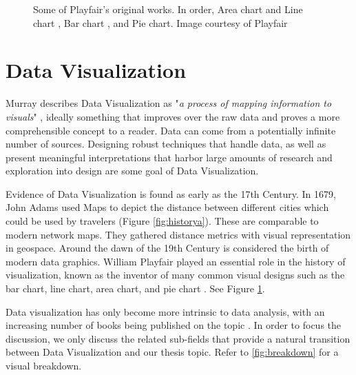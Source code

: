 \begin{figure}[p]
\caption{Some of Playfair's original works. In order, Area chart and Line chart \cite{playfair1801commercial}, Bar chart \cite{playfair1786commercial}, and Pie chart. Image courtesy of Playfair \cite{playfair1801statistical}}\label{fig:historyb}
\end{figure}

\section{Data Visualization}
Murray describes Data Visualization as "\emph{a process of mapping information to visuals}" \cite{murray2017interactive}, ideally something that improves over the raw data and proves a more comprehensible concept to a reader.
Data can come from a potentially infinite number of sources. Designing robust techniques that handle data, as well as present meaningful interpretations that harbor large amounts of research and exploration into design are some goal of Data Visualization.

Evidence of Data Visualization is found as early as the 17th Century. In 1679, John Adams used Maps to depict the distance between different cities which could be used by travelers \cite{adams1932john} (Figure \ref{fig:historya}). These are comparable to modern network maps. They gathered distance metrics with visual representation in geospace.
Around the dawn of the 19th Century is considered the birth of modern data graphics\cite{friendly2001milestones}. William Playfair played an essential role in the history of visualization, known as the inventor of many common visual designs such as the bar chart, line chart, area chart, and pie chart \cite{playfair1786commercial,playfair1801commercial, playfair1801statistical}. See Figure \ref{fig:historyb}. 

Data visualization has only become more intrinsic to data analysis, with an increasing number of books being published on the topic \cite{rees2019survey}. In order to focus the discussion, we only discuss the related sub-fields that provide a natural transition between Data Visualization and our thesis topic. Refer to \ref{fig:breakdown} for a visual breakdown.

